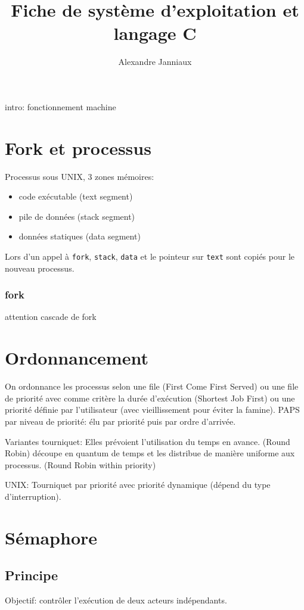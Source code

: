 \documentclass[10pt,twocolumn,a4paper]{article}
\title{Fiche de système d'exploitation et langage C}
\author{Alexandre Janniaux}
\begin{document}
\maketitle

intro: fonctionnement machine

\section{Fork et processus}

Processus sous {UNIX}, 3 zones mémoires:
\begin{itemize}
    \item code exécutable (text segment)
    \item pile de données (stack segment)
    \item données statiques (data segment)
\end{itemize}

Lors d'un appel à \texttt{fork}, \texttt{stack}, \texttt{data} et le pointeur sur \texttt{text} sont copiés pour le nouveau processus.

\subsubsection{fork}
attention cascade de fork

\section{Ordonnancement}

On ordonnance les processus selon une file (First Come First Served) ou une file de priorité avec comme critère la durée d'exécution (Shortest Job First) ou une priorité définie par l'utilisateur (avec vieillissement pour éviter la famine).
PAPS par niveau de priorité: élu par priorité puis par ordre d'arrivée.

Variantes tourniquet: Elles prévoient l'utilisation du temps en avance.
(Round Robin) découpe en quantum de temps et les distribue de manière uniforme aux processus.
(Round Robin within priority)

{UNIX}: Tourniquet par priorité avec priorité dynamique (dépend du type d'interruption).


\section{Sémaphore}

\subsection{Principe}
Objectif: contrôler l'exécution de deux acteurs indépendants.
\end{document}
